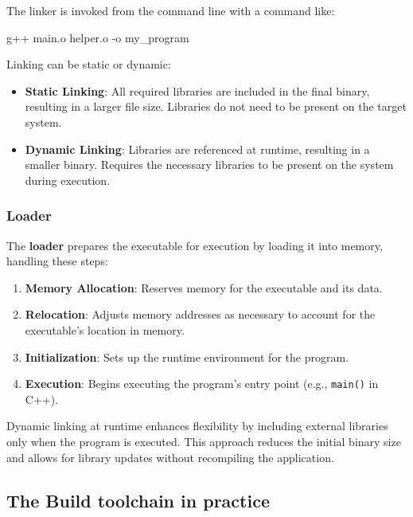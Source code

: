     The linker is invoked from the command line with a command like:
    
    \begin{codeblock}[language=bash, numbers=none]
g++ main.o helper.o -o my_program
    \end{codeblock}
    
    Linking can be static or dynamic:
    \begin{itemize}
        \item \textbf{Static Linking}: All required libraries are included in the final binary, resulting in a larger file size. Libraries do not need to be present on the target system.
        \item \textbf{Dynamic Linking}: Libraries are referenced at runtime, resulting in a smaller binary. Requires the necessary libraries to be present on the system during execution.
    \end{itemize}

\subsubsection{Loader}
    
    The \textbf{loader} prepares the executable for execution by loading it into memory, handling these steps:
    \begin{enumerate}
        \item \textbf{Memory Allocation}: Reserves memory for the executable and its data.
        \item \textbf{Relocation}: Adjusts memory addresses as necessary to account for the executable's location in memory.
        \item \textbf{Initialization}: Sets up the runtime environment for the program.
        \item \textbf{Execution}: Begins executing the program's entry point (e.g., \texttt{main()} in C++).
    \end{enumerate}
    
    \begin{observationblock}
        Dynamic linking at runtime enhances flexibility by including external libraries only when the program is executed. This approach reduces the initial binary size and allows for library updates without recompiling the application.
    \end{observationblock}

\subsection{The Build toolchain in practice}

